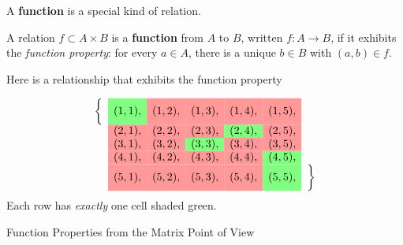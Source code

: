\documentclass[10pt]{beamer}
\begin{document}
\begin{frame}
\footnotesize 

\begin{myredbox}[title=Remark]
A \textbf{function} is a special kind of relation.
\end{myredbox}

\begin{myyellowbox}[title=Definition]
A relation $f \subset A \times B$ is a \textbf{function} from $A$ to $B$, written $f: A \to B$, if it exhibits the \textit{function property}: for every $a \in A$, there is a unique $b \in B$ with $(a,b) \in f$.
\end{myyellowbox}


\begin{mygreenbox}[title=Example]
Here is a relationship that exhibits the function property

     \[
    \begin{array}{ccccccc}
        \bigg\{ &   \cellcolor{green!50} (1,1), & \cellcolor{red!40} (1,2), & \cellcolor{red!40} (1,3), & \cellcolor{red!40} (1,4), & \cellcolor{red!40} (1,5), &\\
         & \cellcolor{red!40} (2,1), & \cellcolor{red!40} (2,2), & \cellcolor{red!40} (2,3), & \cellcolor{green!50} (2,4), & \cellcolor{red!40} (2,5), &\\
        & \cellcolor{red!40} (3,1), & \cellcolor{red!40} (3,2), & \cellcolor{green!50} (3,3), & \cellcolor{red!40} (3,4), & \cellcolor{red!40} (3,5), &\\
        & \cellcolor{red!40} (4,1), & \cellcolor{red!40} (4,2), & \cellcolor{red!40} (4,3), & \cellcolor{red!40} (4,4), & \cellcolor{green!50} (4,5), & \\
        & \cellcolor{red!40} (5,1), & \cellcolor{red!40} (5,2), & \cellcolor{red!40} (5,3), & \cellcolor{red!40} (5,4), & \cellcolor{green!50} (5,5), & \bigg\} \\
    \end{array}
    \]
  Each row has \textit{exactly} one cell shaded green.
\end{mygreenbox}

\end{frame}

\begin{frame}[standout]
Function Properties from the Matrix Point of View
\end{frame}
\end{document}
